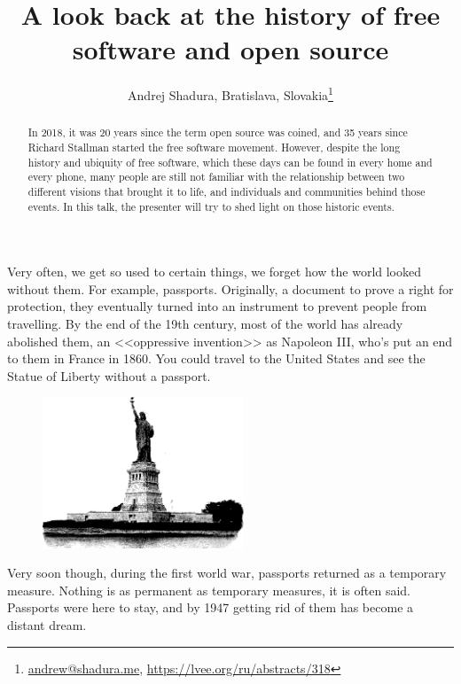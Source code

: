 \documentclass[10pt, a5paper]{article}
\begin{document}
\title{A look back at the history of free software and open source}
\author{Andrej Shadura, Bratislava, Slovakia\footnote{\url{andrew@shadura.me}, \url {https://lvee.org/ru/abstracts/318}}}
\maketitle
\begin{abstract}
In 2018, it was 20 years since the term open source was coined, and 35 years since Richard Stallman started the free software movement. However, despite the long history and ubiquity of free software, which these days can be found in every home and every phone, many people are still not familiar with the relationship between two different visions that brought it to life, and individuals and communities behind those events. In this talk, the presenter will try to shed light on those historic events.
\end{abstract}

Very often, we get so used to certain things, we forget how the world looked without them. For example, passports. Originally, a document to prove a right for protection, they eventually turned into an instrument to prevent people from travelling. By the end of the 19th century, most of the world has already abolished them, an <<oppressive invention>> as Napoleon III, who's put an end to them in France in 1860. You could travel to the United States and see the Statue of Liberty without a passport.

\begin{center}
\begin{figure}[h!]
  \centering
  \includegraphics[width=6cm]{14_2019_Shadura1.jpg}
  \label{fig1}
\end{figure}
\end{center}

Very soon though, during the first world war, passports returned as a temporary measure. Nothing is as permanent as temporary measures, it is often said. Passports were here to stay, and by 1947 getting rid of them has become a distant dream.
\end{document}
